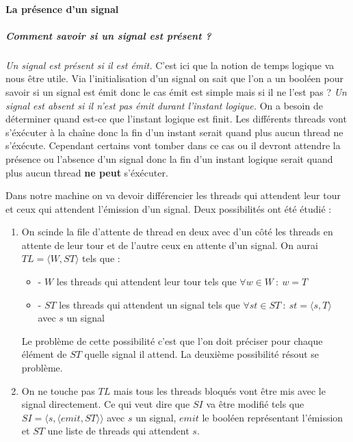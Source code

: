 \documentclass[10pt,a4paper]{article}
\begin{document}
					
				\paragraph{La présence d'un signal}
					
					\subparagraph{Comment savoir si un signal est présent ?}
					\textit{Un signal est présent si il est émit.}
					\smallbreak
					C'est ici que la notion de temps logique va nous être utile. Via l'initialisation d'un signal on sait que l'on a un booléen pour savoir si un signal est émit donc le cas émit est simple mais si il ne l'est pas ? 
					\smallbreak
					\textit{Un signal est absent si il n'est pas émit durant l'instant logique.}
					\smallbreak
					On a besoin de déterminer quand est-ce que l'instant logique est finit. Les différents threads vont s'éxécuter à la chaîne donc la fin d'un instant serait quand plus aucun thread ne s'éxécute. Cependant certains vont tomber dans ce cas ou il devront attendre la présence ou l'absence d'un signal donc la fin d'un instant logique serait quand plus aucun thread \textbf{ne peut} s'éxécuter. 
					\medbreak
						
					Dans notre machine on va devoir différencier les threads qui attendent leur tour et ceux qui attendent l'émission d'un signal. Deux possibilités ont été étudié :
					\begin{enumerate}
						\item On scinde la file d'attente de thread en deux avec d'un côté les threads en attente de leur tour et 
						de l'autre ceux en attente d'un signal. On aurai $TL =\langle W,ST\rangle$ tels que :
						\begin{itemize}
							\item[] - $W$ les threads qui attendent leur tour tels que $\forall w \in W~:~w = T$ 
							\item[] - $ST$ les threads qui attendent un signal tels que $\forall st \in ST~:~st = \langle s,T\rangle$ avec $s$ un signal
						\end{itemize}
						\medbreak
							
						Le problème de cette possibilité c'est que l'on doit préciser pour chaque élément de $ST$ quelle signal il attend. La deuxième possibilité résout se problème.
						\item On ne touche pas $TL$ mais tous les threads bloqués vont être mis avec le signal directement. Ce qui veut dire que $SI$ va être modifié tels que $SI = \langle s , \langle emit , ST \rangle\rangle$ avec $s$ un signal, $emit$ le booléen représentant l'émission et $ST$ une liste de threads qui attendent $s$.
					\end{enumerate}
					\medbreak
						
\end{document}
